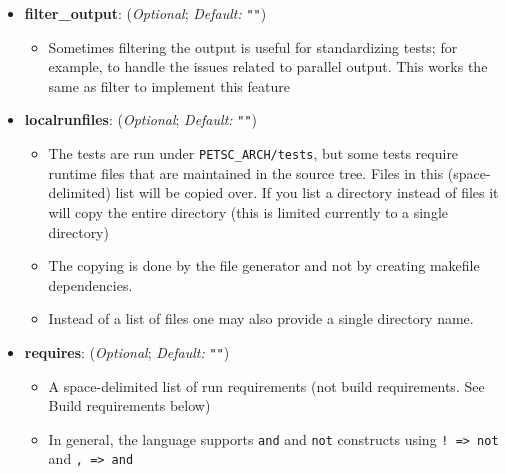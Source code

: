 \begin{itemize}
\begin{itemize}
      \end{itemize}

    \item[]  \textbf{filter\_output}: (\emph{Optional}; \emph{Default:} \lstinline{""})

      \begin{itemize}

      \item Sometimes filtering the output is useful for standardizing
            tests; for example, to handle the issues related to parallel
            output.  This works the same as filter to implement this
            feature

      \end{itemize}

    \item[]  \textbf{localrunfiles}: (\emph{Optional}; \emph{Default:} \lstinline{""})

      \begin{itemize}

      \item The tests are run under \lstinline{PETSC_ARCH/tests}, but
            some tests require runtime files that are maintained in the
            source tree.  Files in this (space-delimited) list will be
            copied over. If you list a directory instead of files it will copy the
            entire directory (this is limited currently to a single directory)

      \item The copying is done by the file generator and not by
            creating makefile dependencies.

      \item Instead of a list of files one may also provide a single directory name.

      \end{itemize}

    \item[]  \textbf{requires}: (\emph{Optional}; \emph{Default:} \lstinline{""})
      \begin{itemize}

        \item A space-delimited list of run requirements (not
        build requirements. See Build requirements below)

        \item In general, the language supports \lstinline{and} and \lstinline{not} constructs
        using \lstinline{! => not} and \lstinline{, => and}


\end{itemize}
\end{itemize}
